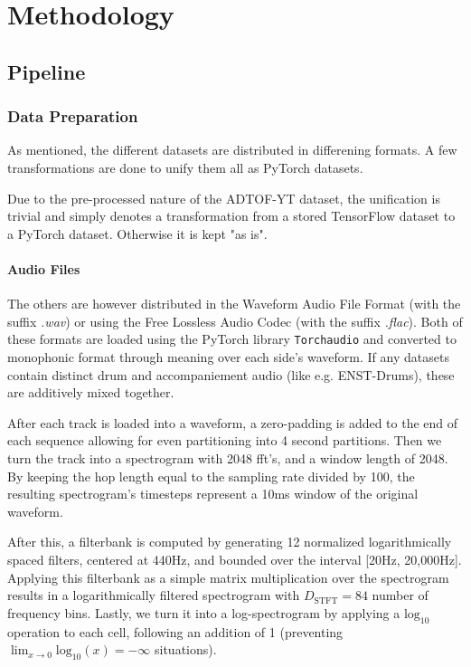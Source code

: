 \chapter{Methodology}

\section{Pipeline}

\subsection{Data Preparation}

As mentioned, the different datasets are distributed in differening formats. A few transformations are done to unify them all as PyTorch datasets.

Due to the pre-processed nature of the ADTOF-YT dataset, the unification is trivial and simply denotes a transformation from a stored TensorFlow dataset to a PyTorch dataset. Otherwise it is kept "as is".

\subsubsection{Audio Files}

The others are however distributed in the Waveform Audio File Format (with the suffix \textit{.wav}) or using the Free Lossless Audio Codec (with the suffix \textit{.flac}). Both of these formats are loaded using the PyTorch library \texttt{Torchaudio} and converted to monophonic format through meaning over each side's waveform. If any datasets contain distinct drum and accompaniement audio (like e.g. ENST-Drums), these are additively mixed together.

After each track is loaded into a waveform, a zero-padding is added to the end of each sequence allowing for even partitioning into 4 second partitions. Then we turn the track into a spectrogram with 2048 fft's, and a window length of 2048. By keeping the hop length equal to the sampling rate divided by 100, the resulting spectrogram's timesteps represent a 10ms window of the original waveform.

After this, a filterbank is computed by generating 12 normalized logarithmically spaced filters, centered at 440Hz, and bounded over the interval [20Hz, 20,000Hz]. Applying this filterbank as a simple matrix multiplication over the spectrogram results in a logarithmically filtered spectrogram with $D_\text{STFT} = 84$ number of frequency bins. Lastly, we turn it into a log-spectrogram by applying a $\text{log}_{10}$ operation to each cell, following an addition of 1 (preventing $\lim_{x \to 0}\text{log}_{10}(x) = -\infty$ situations).


